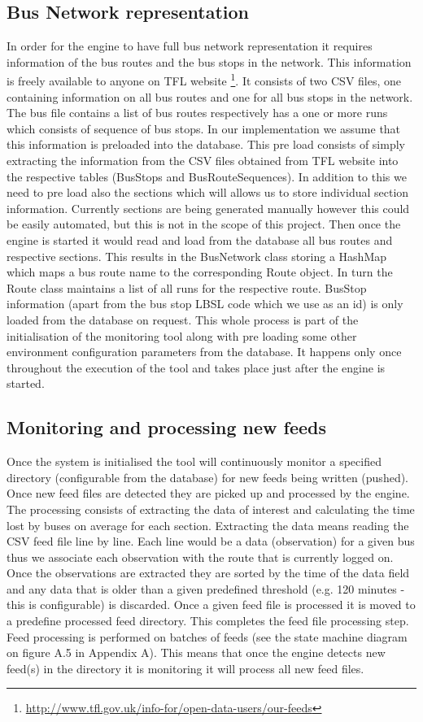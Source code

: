 \subsection{Bus Network representation}
In order for the engine to have full bus network representation it requires information of the bus routes and the bus stops in the network. This information is freely available to anyone on TFL website \footnote{\url{http://www.tfl.gov.uk/info-for/open-data-users/our-feeds}}. It consists of two CSV files, one containing information on all bus routes and one for all bus stops in the network. The bus file contains a list of bus routes respectively has a one or more runs which consists of sequence of bus stops. In our implementation we assume that this information is preloaded into the database. This pre load consists of simply extracting the information from the CSV files obtained from TFL website into the respective tables (BusStops and BusRouteSequences). In addition to this we need to pre load also the sections which will allows us to store individual section information. Currently sections are being generated manually however this could be easily automated, but this is not in the scope of this project. Then once the engine is started it would read and load from the database all bus routes and respective sections. This results in the BusNetwork class storing a HashMap which maps a bus route name to the corresponding Route object. In turn the Route class maintains a list of all runs for the respective route. BusStop information (apart from the bus stop LBSL code which we use as an id) is only loaded from the database on request. This whole process is part of the initialisation of the monitoring tool along with pre loading some other environment configuration parameters from the database. It happens only once throughout the execution of the tool and takes place just after the engine is started.

\subsection{Monitoring and processing new feeds}
Once the system is initialised the tool will continuously monitor a specified directory (configurable from the database) for new feeds being written (pushed). Once new feed files are detected they are picked up and processed by the engine. The processing consists of extracting the data of interest and calculating the time lost by buses on average for each section. Extracting the data means reading the CSV feed file line by line. Each line would be a data (observation) for a given bus thus we associate each observation with the route that is currently logged on. Once the observations are extracted they are sorted by the time of the data field and any data that is older than a given predefined threshold (e.g. 120 minutes - this is configurable) is discarded. Once a given feed file is processed it is moved to a predefine processed feed directory. This completes the feed file processing step. Feed processing is performed on batches of feeds (see the state machine diagram on figure A.5 in Appendix A). This means that once the engine detects new feed(s) in the directory it is monitoring it will process all new feed files. 

